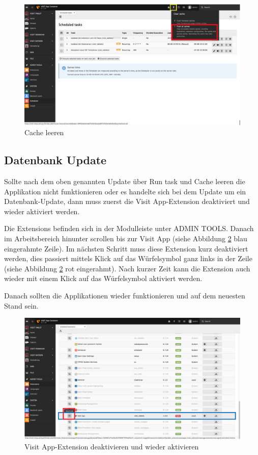 \begin{figure}[ht!]
\centering
\includegraphics[width=12cm]{Figures/paula/update_prozess/cache.png}
\caption{Cache leeren}
\label{img:cache}
\end{figure}

\subsection{Datenbank Update}

Sollte nach dem oben genannten Update über \glqq Run task\grqq{} und Cache leeren die Applikation nicht funktionieren oder es handelte sich bei dem Update um ein Datenbank-Update, dann muss zuerst die Visit App-Extension deaktiviert und wieder aktiviert werden.

Die Extensions befinden sich in der Modulleiste unter ADMIN TOOLS. Danach im Arbeitsbereich hinunter scrollen bis zur Visit App (siehe Abbildung \ref{img:extension} blau eingerahmte Zeile). Im nächsten Schritt muss diese Extension kurz deaktiviert werden, dies passiert mittels Klick auf das Würfelsymbol ganz links in der Zeile (siehe Abbildung \ref{img:extension} rot eingerahmt). Nach kurzer Zeit kann die Extension auch wieder mit einem Klick auf das Würfelsymbol aktiviert werden.

Danach sollten die Applikationen wieder funktionieren und auf dem neuesten Stand sein.

\begin{figure}[ht!]
\centering
\includegraphics[width=12cm]{Figures/paula/update_prozess/update_extension.png}
\caption{Visit App-Extension deaktivieren und wieder aktivieren}
\label{img:extension}
\end{figure}

